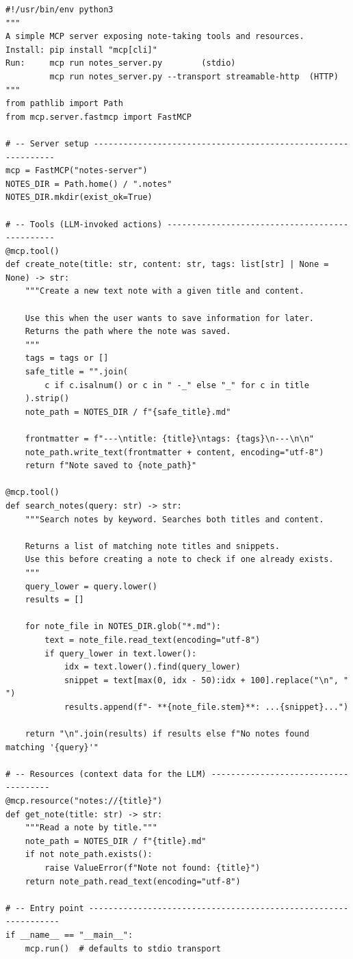 \begin{lstlisting}[style=pythonstyle, caption={Complete MCP Server: Note-Taking Tool (FastMCP)}]
#!/usr/bin/env python3
"""
A simple MCP server exposing note-taking tools and resources.
Install: pip install "mcp[cli]"
Run:     mcp run notes_server.py        (stdio)
         mcp run notes_server.py --transport streamable-http  (HTTP)
"""
from pathlib import Path
from mcp.server.fastmcp import FastMCP

# -- Server setup --------------------------------------------------------------
mcp = FastMCP("notes-server")
NOTES_DIR = Path.home() / ".notes"
NOTES_DIR.mkdir(exist_ok=True)

# -- Tools (LLM-invoked actions) -----------------------------------------------
@mcp.tool()
def create_note(title: str, content: str, tags: list[str] | None = None) -> str:
    """Create a new text note with a given title and content.

    Use this when the user wants to save information for later.
    Returns the path where the note was saved.
    """
    tags = tags or []
    safe_title = "".join(
        c if c.isalnum() or c in " -_" else "_" for c in title
    ).strip()
    note_path = NOTES_DIR / f"{safe_title}.md"

    frontmatter = f"---\ntitle: {title}\ntags: {tags}\n---\n\n"
    note_path.write_text(frontmatter + content, encoding="utf-8")
    return f"Note saved to {note_path}"

@mcp.tool()
def search_notes(query: str) -> str:
    """Search notes by keyword. Searches both titles and content.

    Returns a list of matching note titles and snippets.
    Use this before creating a note to check if one already exists.
    """
    query_lower = query.lower()
    results = []

    for note_file in NOTES_DIR.glob("*.md"):
        text = note_file.read_text(encoding="utf-8")
        if query_lower in text.lower():
            idx = text.lower().find(query_lower)
            snippet = text[max(0, idx - 50):idx + 100].replace("\n", " ")
            results.append(f"- **{note_file.stem}**: ...{snippet}...")

    return "\n".join(results) if results else f"No notes found matching '{query}'"

# -- Resources (context data for the LLM) -------------------------------------
@mcp.resource("notes://{title}")
def get_note(title: str) -> str:
    """Read a note by title."""
    note_path = NOTES_DIR / f"{title}.md"
    if not note_path.exists():
        raise ValueError(f"Note not found: {title}")
    return note_path.read_text(encoding="utf-8")

# -- Entry point ----------------------------------------------------------------
if __name__ == "__main__":
    mcp.run()  # defaults to stdio transport
\end{lstlisting}

